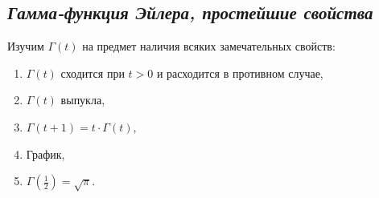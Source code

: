 \subsection{\itshape Гамма-функция Эйлера, простейшие свойства}

\begin{theorem} \hypertarget{t41}{}
	Изучим \(\Gamma(t)\) на предмет наличия всяких замечательных \linebreak свойств:
	\begin{enumerate}
		\item \(\Gamma(t)\) сходится при \(t > 0\) и расходится в противном случае,
		\item \(\Gamma(t)\) выпукла,
		\item \(\Gamma(t + 1) = t \cdot \Gamma(t)\),%
		\item График,
		\item \(\Gamma \left(\frac{1}{2} \right) = \sqrt{\pi}\).
	\end{enumerate}
\end{theorem}
